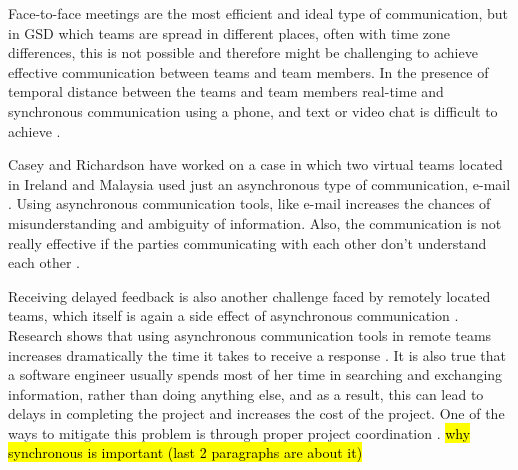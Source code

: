 Face-to-face meetings are the most efficient and ideal type of communication, but in GSD which teams are spread in different places, often with time zone differences, this is not possible and therefore might be challenging to achieve effective communication between teams and team members. In the presence of temporal distance between the teams and team members real-time and synchronous communication using a phone, and text or video chat is difficult to achieve \citep{holmstrom2006agile,kommeren2007philips}.

Casey and Richardson have worked on a case in which two virtual teams located in Ireland and Malaysia used just an asynchronous type of communication, e-mail \citep{casey2008impact}. Using asynchronous communication tools, like e-mail increases the chances of misunderstanding and ambiguity of information. Also, the communication is not really effective if the parties communicating with each other don’t understand each other \citep{kommeren2007philips,cataldo2007coordination}.

Receiving delayed feedback is also another challenge faced by remotely located teams, which itself is again a side effect of asynchronous communication \citep{conchuir2006exploring,holmstrom2006agile}. Research shows that using asynchronous communication tools in remote teams increases dramatically the time it takes to receive a response \citep{holmstrom2006global}. It is also true that a software engineer usually spends most of her time in searching and exchanging information, rather than doing anything else, and as a result, this can lead to delays in completing the project and increases the cost of the project. One of the ways to mitigate this problem is through proper project coordination \citep{dumitriu2006issues}. \hl{why synchronous is important (last 2 paragraphs are about it)}